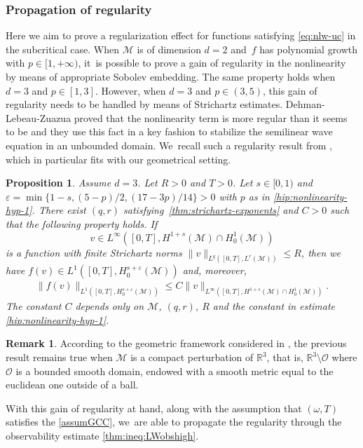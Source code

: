 \documentclass[10pt]{amsart}
\newtheorem{proposition}[theorem]{Proposition}
\theoremstyle{definition}
\newtheorem{remark}[theorem]{Remark}
\let\mc\mathcal
\let\veps\varepsilon
\newcommand{\M}{\mc{M}}
\renewcommand{\O}{\mc{O}}
\newcommand{\R}{\mathbb{R}}
\providecommand{\norm}[1]{\lVert#1\rVert}
\begin{document}
\subsubsection{Propagation of regularity} Here we aim to prove a regularization effect for functions satisfying \eqref{eq:nlw-uc} in the subcritical case. When $\M$ is of dimension $d=2$ and~$f$ has polynomial growth with $p\in [1, +\infty)$, it~is possible to prove a gain of regularity in the nonlinearity by means of appropriate Sobolev embedding. The same property holds when $d=3$ and $p\in [1, 3]$. However, when $d=3$ and $p\in (3, 5)$, this gain of regularity needs to be handled by means of Strichartz estimates. Dehman-Lebeau-Zuazua \cite[Th.\,8]{DLZ03} proved that the nonlinearity term is more regular than it seems to be and they use this fact in a key fashion to stabilize the semilinear wave equation in an unbounded domain. We~recall such a regularity result from \cite[Cor.\,4.2]{JL13}, which in particular fits with our geometrical setting.

\begin{proposition}\label{prop:gain-reg-nonlinearity}
Assume $d=3$. Let $R>0$ and $T>0$. Let $s\in [0, 1)$ and $\veps=\min\{1-s, (5-p)/2, (17-3p)/14\}>0$ with $p$ as in \eqref{hip:nonlinearity-hyp-1}. There exist $(q, r)$ satisfying~\eqref{thm:strichartz-exponents} and $C>0$ such that the following property holds. If
\[
v\in L^\infty([0, T], H^{1+s}(\M)\cap H_0^1(\M))
\]
is a function with finite Strichartz norms $\norm{v}_{L^q([0, T], L^r(\M))}\leq R$, then we have $f(v)\in L^1([0, T], H_0^{s+\veps}(\M))$ and, moreover,
\begin{align*}
\norm{f(v)}_{L^1([0, T], H_0^{s+\veps}(\M))}\leq C\norm{v}_{L^\infty([0, T], H^{1+s}(\M)\cap H_0^1(\M))}.
\end{align*}
The constant $C$ depends only on $\M$, $(q, r)$, $R$ and the constant in estimate \eqref{hip:nonlinearity-hyp-1}.
\end{proposition}
\begin{remark}\label{rk:gain-reg-cpct-pert}
According to the geometric framework considered in \cite{JL13}, the previous result remains true when $\M$ is a compact perturbation of $\R^3$, that is, $\R^3\setminus\O$ where $\O$ is a bounded smooth domain, endowed with a smooth metric equal to the euclidean one outside of a ball.
\end{remark}

With this gain of regularity at hand, along with the assumption that $(\omega, T)$ satisfies the \ref{assumGCC}, we~are able to propagate the regularity through the observability estimate \eqref{thm:ineq:LWobshigh}.
\end{document}
